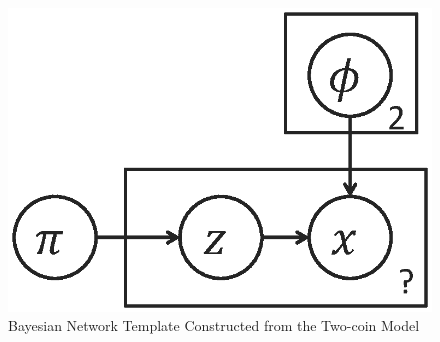 \begin{figure}[h]
\centering
\includegraphics[scale=0.4]{figs/two_coins_bn1.eps}
\caption{Bayesian Network Template Constructed from the Two-coin Model}
\label{fig:two_coins_bn1}
\end{figure}

